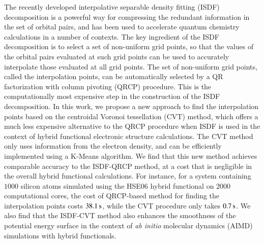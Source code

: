 The recently developed interpolative separable density fitting (ISDF)
decomposition is a powerful way for compressing the redundant information in the
set of orbital pairs, and has been used to accelerate quantum chemistry
calculations in a number of contexts. The key ingredient of the ISDF
decomposition is to select a set of non-uniform grid points, so that the values
of the orbital pairs evaluated at such grid points can be used to accurately
interpolate those evaluated at all grid points. The set of non-uniform grid
points, called the interpolation points, can be automatically selected by a QR
factorization with column pivoting (QRCP) procedure. This is the computationally
most expensive step in the construction of the ISDF decomposition. In this work,
we propose a new approach to find the interpolation points based on the
centroidal Voronoi tessellation (CVT) method, which offers a much less expensive
alternative to the QRCP procedure when ISDF is used in the context of hybrid
functional electronic structure calculations. The CVT method only uses
information from the electron density, and can be efficiently implemented using
a K-Means algorithm. We find that this new method achieves comparable accuracy
to the ISDF-QRCP method, at a cost that is negligible in the overall hybrid
functional calculations. For instance, for a system containing $1000$ silicon
atoms simulated using the HSE06 hybrid functional on $2000$ computational cores,
the cost of QRCP-based method for finding the interpolation points costs
$38.1\operatorname{s}$, while the CVT procedure only takes $0.7\operatorname{s}$.  We also find that the
ISDF-CVT method also enhances the smoothness of the potential energy surface in
the context of \emph{ab initio} molecular dynamics (AIMD) simulations with
hybrid functionals.